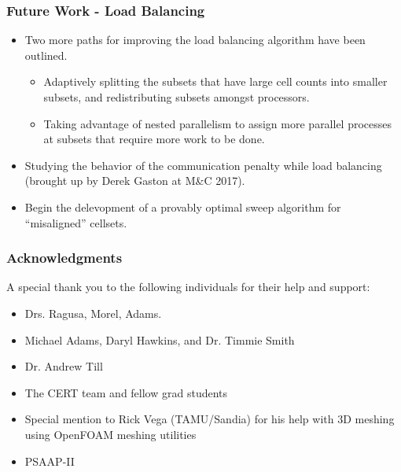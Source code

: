 \documentclass[compress]{beamer}
\begin{document}
\begin{frame}[t]\frametitle{Future Work - Load Balancing}
\begin{block}{}
\begin{itemize}
\item Two more paths for improving the load balancing algorithm have been outlined.
\begin{itemize} 
\item Adaptively splitting the subsets that have large cell counts into smaller subsets, and redistributing subsets amongst processors.
\item Taking advantage of nested parallelism to assign more parallel processes at subsets that require more work to be done.
\end{itemize}
\item Studying the behavior of the communication penalty while load balancing (brought up by Derek Gaston at M\&C 2017).
\item Begin the delevopment of a provably optimal sweep algorithm for ``misaligned'' cellsets.
\end{itemize}
\end{block}
\end{frame}


\begin{frame}[t]\frametitle{Acknowledgments}
\begin{block}{}
A special thank you to the following individuals for their help and support:
\begin{itemize}
\item Drs. Ragusa, Morel, Adams.
\item Michael Adams, Daryl Hawkins, and Dr. Timmie Smith
\item Dr. Andrew Till
\item The CERT team and fellow grad students 
\item Special mention to Rick Vega (TAMU/Sandia) for his help with 3D meshing using OpenFOAM meshing utilities
\item PSAAP-II 
\end{itemize}
\end{block}
\end{frame}

%
%



%	
%	
%	
%	
%
\end{document}
